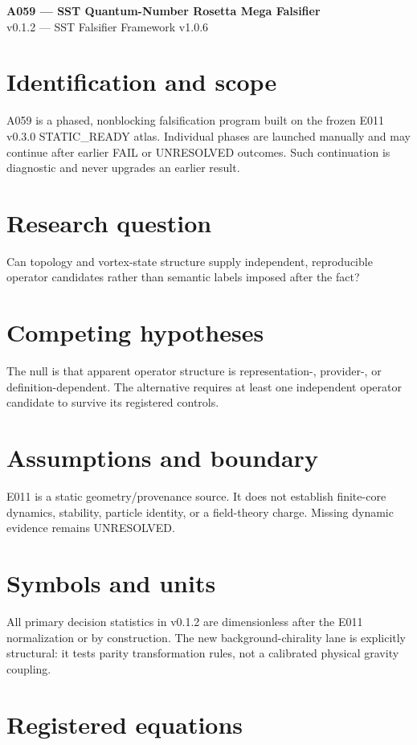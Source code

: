 \documentclass[11pt]{article}
\begin{document}
\begin{center}{\Large\bfseries A059 --- SST Quantum-Number Rosetta Mega Falsifier}\\[3pt]
{\large v0.1.2 --- SST Falsifier Framework v1.0.6}\end{center}
\section{Identification and scope}
A059 is a phased, nonblocking falsification program built on the frozen E011 v0.3.0 STATIC\_READY atlas. Individual phases are launched manually and may continue after earlier FAIL or UNRESOLVED outcomes. Such continuation is diagnostic and never upgrades an earlier result.
\section{Research question}
Can topology and vortex-state structure supply independent, reproducible operator candidates rather than semantic labels imposed after the fact?
\section{Competing hypotheses}
The null is that apparent operator structure is representation-, provider-, or definition-dependent. The alternative requires at least one independent operator candidate to survive its registered controls.
\section{Assumptions and boundary}
E011 is a static geometry/provenance source. It does not establish finite-core dynamics, stability, particle identity, or a field-theory charge. Missing dynamic evidence remains UNRESOLVED.
\section{Symbols and units}
All primary decision statistics in v0.1.2 are dimensionless after the E011 normalization or by construction. The new background-chirality lane is explicitly structural: it tests parity transformation rules, not a calibrated physical gravity coupling.
\section{Registered equations}
\end{document}
